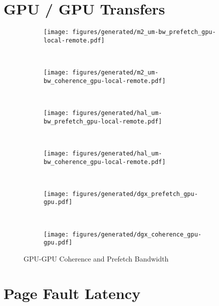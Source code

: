 \section{GPU / GPU Transfers}
\label{sec:um-gpu-gpu}

\begin{figure}[ht]
    \centering
    \begin{subfigure}[b]{0.45\textwidth}
        \texttt{[image: figures/generated/m2\_um-bw\_prefetch\_gpu-local-remote.pdf]}
        \caption{}
        \label{fig:um-prefetch-s822lc-gpu-gpu}
    \end{subfigure}
    ~
    \begin{subfigure}[b]{0.45\textwidth}
        \texttt{[image: figures/generated/m2\_um-bw\_coherence\_gpu-local-remote.pdf]}
        \caption{}
        \label{fig:um-coherence-s822lc-gpu-gpu}
    \end{subfigure}
    \\
    \begin{subfigure}[b]{0.45\textwidth}
        \texttt{[image: figures/generated/hal\_um-bw\_prefetch\_gpu-local-remote.pdf]}
        \caption{}
        \label{fig:um-prefetch-ac922-gpu-gpu}
    \end{subfigure}
    ~
    \begin{subfigure}[b]{0.45\textwidth}
        \texttt{[image: figures/generated/hal\_um-bw\_coherence\_gpu-local-remote.pdf]}
        \caption{}
        \label{fig:um-coherence-ac922-gpu-gpu}
    \end{subfigure}
    \\
    \begin{subfigure}[b]{0.45\textwidth}
        \texttt{[image: figures/generated/dgx\_prefetch\_gpu-gpu.pdf]}
        \caption{}
        \label{fig:um-prefetch-dgx-gpu-gpu}
    \end{subfigure}
    ~
    \begin{subfigure}[b]{0.45\textwidth}
        \texttt{[image: figures/generated/dgx\_coherence\_gpu-gpu.pdf]}
        \caption{}
        \label{fig:um-coherence-dgx-gpu-gpu}
    \end{subfigure}
    \caption[]{
        GPU-GPU Coherence and Prefetch Bandwidth
    }
    \label{fig:um-coherence-gpu-gpu}
\end{figure}




\section{Page Fault Latency}

